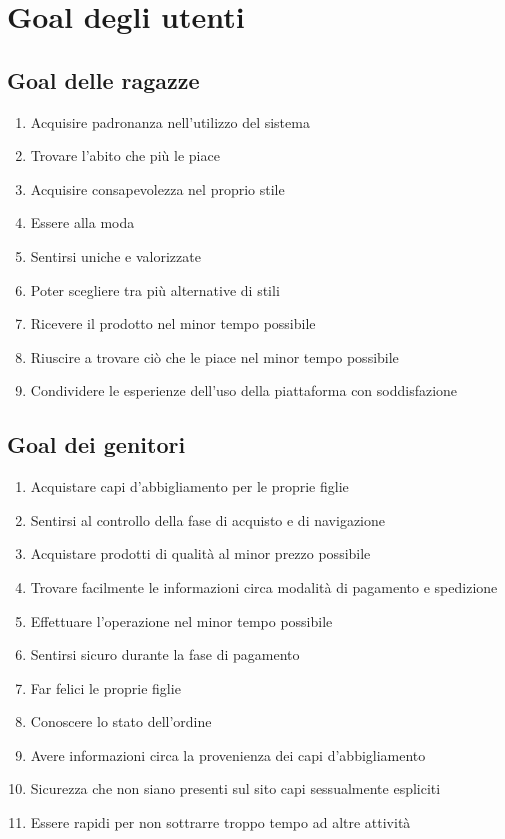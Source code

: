 \documentclass[12pt,a4paper]{report}
\begin{document}
\section{Goal degli utenti}
\subsection*{Goal delle ragazze}
\begin{enumerate}
  \item Acquisire padronanza nell'utilizzo del sistema
  \item Trovare l'abito che più le piace
  \item Acquisire consapevolezza nel proprio stile
  \item Essere alla moda
  \item Sentirsi uniche e valorizzate
  \item Poter scegliere tra più alternative di stili
  \item Ricevere il prodotto nel minor tempo possibile
  \item Riuscire a trovare ciò che le piace nel minor tempo possibile
  \item Condividere le esperienze dell'uso della piattaforma con soddisfazione
\end{enumerate}
\subsection*{Goal dei genitori}
\begin{enumerate}
  \item Acquistare capi d'abbigliamento per le proprie figlie
  \item Sentirsi al controllo della fase di acquisto e di navigazione
  \item Acquistare prodotti di qualità al minor prezzo possibile
  \item Trovare facilmente le informazioni circa modalità di pagamento e spedizione
  \item Effettuare l'operazione nel minor tempo possibile
  \item Sentirsi sicuro durante la fase di pagamento
  \item Far felici le proprie figlie
  \item Conoscere lo stato dell'ordine
  \item Avere informazioni circa la provenienza dei capi d'abbigliamento
  \item Sicurezza che non siano presenti sul sito capi sessualmente espliciti
  \item Essere rapidi per non sottrarre troppo tempo ad altre attività
\end{enumerate}
\end{document}

